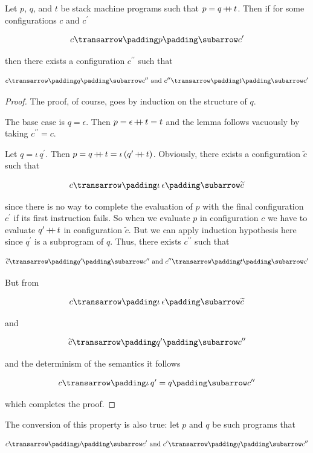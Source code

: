 \begin{lemma}
  Let $p$, $q$, and $t$ be stack machine programs such that $p=q\operatorname{+\kern -0.4em+} t$. Then if for some configurations $c$ and $c^\prime$

  \[
  \trans{c}{p}{c^\prime}
  \]

  then there exists a configuration $c^{\prime\prime}$ such that

  \[
  \trans{c}{q}{c^{\prime\prime}}\mbox{ and  }\trans{c^{\prime\prime}}{t}{c^\prime}
  \]
\end{lemma}
\begin{proof}
  The proof, of course, goes by induction on the structure of $q$.

  The base case is $q=\epsilon$. Then $p=\epsilon\operatorname{+\kern -0.4em+} t=t$ and the lemma follows vacuously by taking $c^{\prime\prime}=c$.

  Let $q=\iota\,q^\prime$. Then $p=q\operatorname{+\kern -0.4em+} t=\iota\,(q^\prime\operatorname{+\kern -0.4em+} t)$. Obviously, there exists a configuration $\widetilde{c}$ such that

  \[
  \trans{c}{\iota\,\epsilon}{\widetilde{c}}
  \]

  since there is no way to complete the evaluation of $p$ with the final configuration $c^\prime$ if its first instruction fails. So
  when we evaluate $p$ in configuration $c$ we have to evaluate $q^\prime\operatorname{+\kern -0.4em+} t$ in configuration $\widetilde{c}$. But we
  can apply induction hypothesis here since $q^\prime$ is a subprogram of $q$. Thus, there exists $c^{\prime\prime}$ such that

  \[
  \trans{\widetilde{c}}{q^\prime}{c^{\prime\prime}}\mbox{ and  }\trans{c^{\prime\prime}}{t}{c^\prime}
  \]

  But from

  \[
  \trans{c}{\iota\,\epsilon}{\widetilde{c}}
  \]

  and

  \[
  \trans{\widetilde{c}}{q^\prime}{c^{\prime\prime}}
  \]

  and the determinism of the semantics it follows

  \[
  \trans{c}{\iota\,q^\prime=q}{c^{\prime\prime}}
  \]

  which completes the proof.
\end{proof}

The conversion of this property is also true: let $p$ and $q$ be such programs that

\[
\trans{c}{p}{c^\prime}\mbox{ and }\trans{c^\prime}{q}{c^{\prime\prime}}
\]

